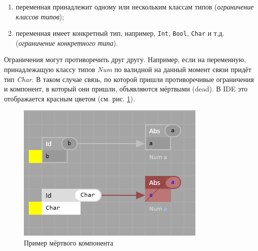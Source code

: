 \begin{description}
\begin{enumerate}[1)]
			\item переменная принадлежит одному или нескольким классам типов (\textit{ограничение классов типов});
			\item переменная имеет конкретный тип, например, \lstinline!Int!, \lstinline!Bool!, \lstinline!Char! и т.д. (\textit{ограничение конкретного типа}).
		\end{enumerate}  
	Ограничения могут противоречить друг другу. Например, если на переменную, принадлежащую классу типов \textit{Num} по валидной на данный момент связи придёт тип \textit{Char}. В таком случае связь, по которой пришли противоречивые ограничения и компонент, в который они пришли, объявляются мёртвыми (dead). В IDE это отображается красным цветом (см. рис. \ref{dead}).	
	\begin{figure}[h]
		\centering
		\includegraphics{img/dead.PNG}
		\caption{Пример мёртвого компонента}\label{dead}
	\end{figure}
	

\end{description}
